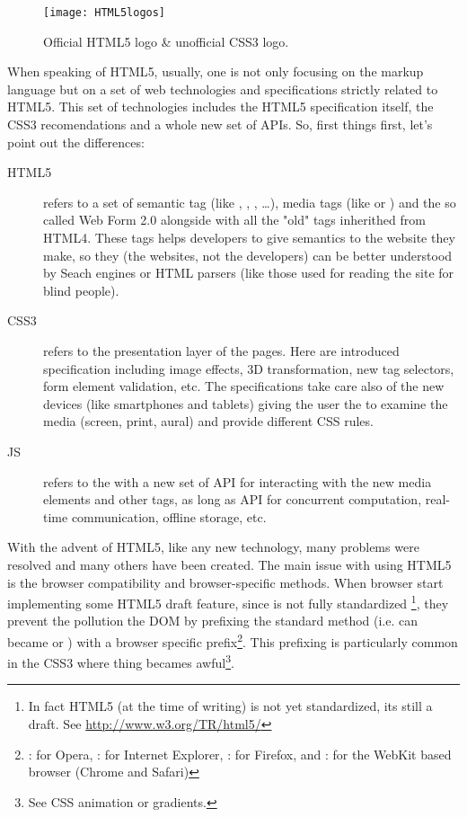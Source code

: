 \begin{figure}[htb]
    \centering
    \texttt{[image: HTML5logos]}
    \caption{Official HTML5 logo \& unofficial CSS3 logo.}
    \label{fig:html-logos}
\end{figure}

When speaking of \ac{HTML}5, usually, one is not only focusing on the markup language
but on a set of web technologies and specifications strictly related to \ac{HTML}5.
This set of technologies includes the \ac{HTML}5 specification itself, the
\ac{CSS}3 recomendations and a whole new set of \js{} APIs. So, first things
first, let's point out the differences:
\begin{description}
	\item[HTML5] refers to a set of semantic tag (like ,
	, , \ldots), media tags (like  or
	) and the so called Web Form 2.0 alongside with all the "old"
	tags inherithed from HTML4. These tags helps developers to give semantics to
	the website they make, so they (the websites, not the developers) can be
	better understood by Seach engines or HTML parsers (like those used for
	reading the site for blind people).

	\item[CSS3] refers to the presentation layer of the pages. Here are introduced
	specification including image effects, 3D transformation, new tag selectors, 
	form element validation, etc. The specifications take care also of the new
	devices (like smartphones and tablets) giving the user the  to examine the media (screen, print, aural) and provide different
	\ac{CSS} rules.
	
	\item[JS] refers to the \js{} with a new set of API for interacting with the
	new media elements and other tags, as long as API for concurrent computation,
	real-time communication, offline storage, etc.\\
\end{description}

With the advent of \ac{HTML}5, like any new technology, many problems were
resolved and many others have been created. The main issue with using \ac{HTML}5
is the browser compatibility and browser-specific methods. When browser start
implementing some \ac{HTML}5 draft feature, since is not fully standardized
\footnote{In fact HTML5 (at the time of writing) is not yet standardized, its
still a draft. See \url{http://www.w3.org/TR/html5/}}, they prevent the pollution
the DOM by prefixing the standard method (i.e. \linebreak{}
can became  or )
with a browser specific prefix\footnote{: for
Opera, : for Internet Explorer, : for Firefox, and
: for the WebKit based browser (Chrome and Safari)}. This prefixing
is particularly common in the \ac{CSS}3 where thing becames awful\footnote{See
CSS animation or gradients.}.\\


